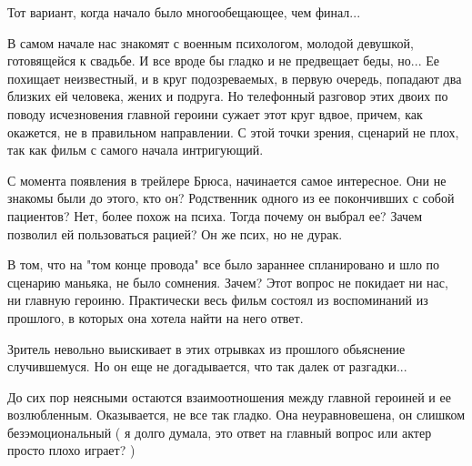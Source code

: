  
 
 
 
 

Тот вариант, когда начало было многообещающее, чем финал...

В самом начале нас знакомят с военным психологом, молодой девушкой, готовящейся
к свадьбе. И все вроде бы гладко и не предвещает беды, но... Ее похищает
неизвестный, и в круг подозреваемых, в первую очередь, попадают два близких ей
человека, жених и подруга. Но телефонный разговор этих двоих по поводу
исчезновения главной героини сужает этот круг вдвое, причем, как окажется, не в
правильном направлении. С этой точки зрения, сценарий не плох, так как фильм с
самого начала интригующий.

С момента появления в трейлере Брюса, начинается самое интересное. Они не
знакомы были до этого, кто он? Родственник одного из ее покончивших с собой
пациентов? Нет, более похож на психа. Тогда почему он выбрал ее? Зачем позволил
ей пользоваться рацией? Он же псих, но не дурак.

В том, что на "том конце провода" все было зараннее спланировано и шло по
сценарию маньяка, не было сомнения. Зачем? Этот вопрос не покидает ни нас, ни
главную героиню. Практически весь фильм состоял из воспоминаний из прошлого, в
которых она хотела найти на него ответ.

Зритель невольно выискивает в этих отрывках из прошлого обьяснение
случившемуся.  Но он еще не догадывается, что так далек от разгадки...

До сих пор неясными остаются взаимоотношения между главной героиней и ее
возлюбленным.  Оказывается, не все так гладко. Она неуравновешена, он слишком
безэмоциональный ( я долго думала, это ответ на главный вопрос или актер просто
плохо играет? )

